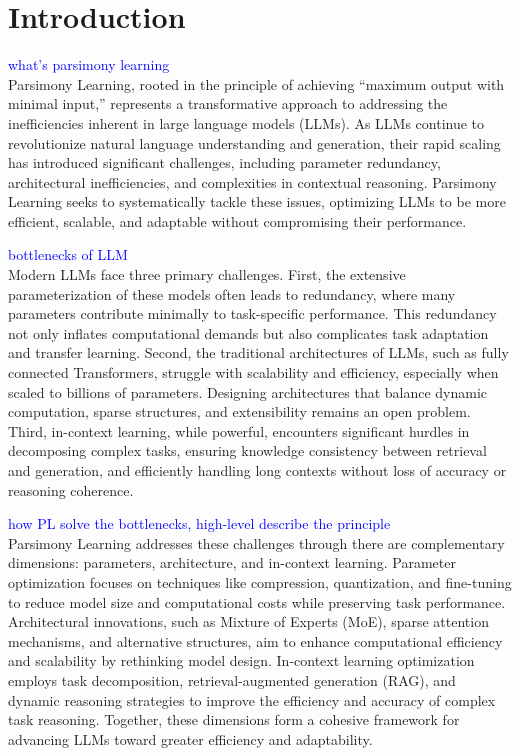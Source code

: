 \section{Introduction}
\textcolor{blue}{what's parsimony learning}\\
Parsimony Learning, rooted in the principle of achieving “maximum output with minimal input,” represents a transformative approach to addressing the inefficiencies inherent in large language models (LLMs). As LLMs continue to revolutionize natural language understanding and generation, their rapid scaling has introduced significant challenges, including parameter redundancy, architectural inefficiencies, and complexities in contextual reasoning. Parsimony Learning seeks to systematically tackle these issues, optimizing LLMs to be more efficient, scalable, and adaptable without compromising their performance.

\textcolor{blue}{bottlenecks of LLM}\\
Modern LLMs face three primary challenges. 
First, the extensive parameterization of these models often leads to redundancy, where many parameters contribute minimally to task-specific performance. This redundancy not only inflates computational demands but also complicates task adaptation and transfer learning. 
Second, the traditional architectures of LLMs, such as fully connected Transformers, struggle with scalability and efficiency, especially when scaled to billions of parameters. Designing architectures that balance dynamic computation, sparse structures, and extensibility remains an open problem. 
Third, in-context learning, while powerful, encounters significant hurdles in decomposing complex tasks, ensuring knowledge consistency between retrieval and generation, and efficiently handling long contexts without loss of accuracy or reasoning coherence.

\textcolor{blue}{how PL solve the bottlenecks, high-level describe the principle}\\
Parsimony Learning addresses these challenges through there are complementary dimensions: parameters, architecture, and in-context learning. Parameter optimization focuses on techniques like compression, quantization, and fine-tuning to reduce model size and computational costs while preserving task performance. Architectural innovations, such as Mixture of Experts (MoE), sparse attention mechanisms, and alternative structures, aim to enhance computational efficiency and scalability by rethinking model design. In-context learning optimization employs task decomposition, retrieval-augmented generation (RAG), and dynamic reasoning strategies to improve the efficiency and accuracy of complex task reasoning. Together, these dimensions form a cohesive framework for advancing LLMs toward greater efficiency and adaptability.

